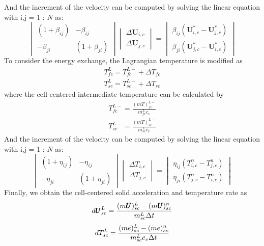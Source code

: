 \documentclass[preprint,12pt]{elsarticle}
\begin{document}
%
%
And the increment of the velocity can be computed by solving the linear equation with i,j = 1 : $N$ as:
%
%
\[ \begin{vmatrix} (1 + \beta_{ij})  &  -\beta_{ij} \\
                  -\beta_{ji}       &  (1 + \beta_{ji})
    \end {vmatrix}
    \begin{vmatrix} \Delta \pmb{U}_{i,c} \\
                    \Delta \pmb{U}_{j,c}
    \end {vmatrix}
    =
    \begin{vmatrix}  \beta_{ij}(\pmb{U}_{i,c}^{*} - \pmb{U}_{j,c}^{*}) \\
                    \beta_{ji}(\pmb{U}_{j,c}^{*} - \pmb{U}_{i,c}^{*})
    \end {vmatrix}                
\]
%
%
To consider the energy exchange, the Lagrangian temperature  is modified as
%
\begin{equation}
\begin{gathered}
T_{fc}^{L} = T_{fc}^{L-} + \Delta T_{fc} \\
T_{sc}^{L} = T_{sc}^{L-} + \Delta T_{sc}
\end {gathered}
\end {equation}
%
%
where the cell-centered intermediate temperature can be calculated by
%
\begin{equation}
\begin{gathered}
T_{fc}^{L-} = \frac{(m T)_{fc}^{L-}}{m_{fc}^L c_v} \\
T_{sc}^{L-} = \frac{(m T)_{sc}^{L-}}{m_{sc}^L c_v} 
\end {gathered}
\end {equation}
%
%
And the increment of the velocity can be computed by solving the linear equation with i,j = 1 : $N$ as:
%
%
\[ \begin{vmatrix} (1 + \eta_{ij})  &  -\eta_{ij} \\
                  -\eta_{ji}       &  (1 + \eta_{ji})
    \end {vmatrix}
    \begin{vmatrix} \Delta T_{i,c} \\
                    \Delta T_{j,c}
    \end {vmatrix}
    =
    \begin{vmatrix}  \eta_{ij}(T_{i,c}^{n} - T_{j,c}^{n}) \\
                    \eta_{ji}(T_{j,c}^{n} - T_{i,c}^{n})
    \end {vmatrix}                
\]
%
%
Finally, we obtain the cell-centered solid  acceleration and temperature rate as
%
%
\begin{equation}
 d\pmb{U}_{sc}^L = \frac{(m \pmb{U})_{sc}^L - (m \pmb{U})_{sc}^n}{m_{sc}^L \Delta{t}}
\end {equation}
%
\begin{equation}
 dT_{sc}^L = \frac{(me)_{sc}^L - (me)_{sc}^n}{m_{sc}^L c_v \Delta{t}}
\end {equation}
%
%
\end{document}
